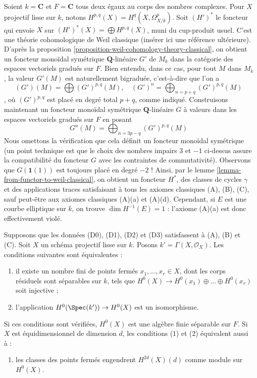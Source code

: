\begin{example}
\label{example-weird-weil}
Soient $k = \mathbf{C}$ et $F = \mathbf{C}$ tous deux égaux au corps
des nombres complexes. Pour $X$ projectif lisse sur $k$, notons
$H^{p, q}(X) = H^q(X, \Omega^p_{X/k})$. Soit $(H')^*$ le foncteur
qui envoie $X$ sur $(H')^*(X) = \bigoplus H^{p, q}(X)$, muni du
cup-produit usuel.
C'est une théorie cohomologique de Weil classique (insérer ici une référence ultérieure).
D'après la proposition \ref{proposition-weil-cohomology-theory-classical},
on obtient un foncteur monoïdal symétrique $\mathbf{Q}$-linéaire $G'$ de $M_k$
dans la catégorie des espaces vectoriels gradués sur $F$. Bien entendu, dans ce cas,
pour tout $M$ dans $M_k$, la valeur $G'(M)$ est naturellement bigraduée, c'est-à-dire
que l'on a
$$
(G')(M) = \bigoplus (G')^{p, q}(M),\quad
(G')^n = \bigoplus\nolimits_{n = p + q} (G')^{p, q}(M)
$$,
où $(G')^{p, q}$ est placé en degré total $p + q$, comme indiqué.
Construisons maintenant un foncteur monoïdal symétrique $\mathbf{Q}$-linéaire
$G$ à valeurs dans les espaces vectoriels gradués sur $F$ en posant
$$
G^n(M) = \bigoplus\nolimits_{n = 3p - q} (G')^{p, q}(M)
$$
Nous omettons la vérification que cela définit un foncteur monoïdal
symétrique (un point technique est que le choix des nombres impairs
$3$ et $-1$ ci-dessus assure la compatibilité du foncteur $G$ avec
les contraintes de commutativité).
Observons que $G(\mathbf{1}(1))$ est toujours placé en degré $-2$ !
Ainsi, par le lemme \ref{lemma-from-functor-to-weil-classical},
on obtient un foncteur $H^*$, des classes de cycles $\gamma$ et des applications traces
satisfaisant à tous les axiomes classiques (A), (B), (C), sauf peut-être
aux axiomes classiques (A)(a) et (A)(d).
Cependant, si $E$ est une courbe elliptique sur $k$, on trouve
$\dim H^{-1}(E) = 1$ : l'axiome (A)(a) est donc effectivement violé.
\end{example}

\begin{lemma}
\label{lemma-H-0-separable}
Supposons que les données (D0), (D1), (D2) et (D3) satisfassent à (A), (B) et (C).
Soit $X$ un schéma projectif lisse sur $k$.
Posons $k' = \Gamma(X, \mathcal{O}_X)$. Les conditions suivantes sont équivalentes :
\begin{enumerate}
\item il existe un nombre fini de points fermés $x_1, \ldots, x_r \in X$,
dont les corps résiduels sont séparables sur $k$, tels que
$H^0(X) \to H^0(x_1) \oplus \ldots \oplus H^0(x_r)$ soit injective ;
\item l'application $H^0(\Spec(k')) \to H^0(X)$ est un isomorphisme.
\end{enumerate}
Si ces conditions sont vérifiées, $H^0(X)$ est une algèbre finie séparable sur $F$.
Si $X$ est équidimensionnel de dimension $d$, les conditions (1) et (2)
équivalent aussi à :
\begin{enumerate}
\item[(3)] les classes des points fermés engendrent $H^{2d}(X)(d)$
comme module sur $H^0(X)$.
\end{enumerate}
\end{lemma}

